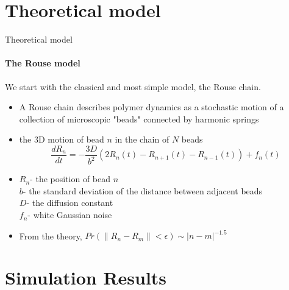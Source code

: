 \documentclass[8pt]{beamer}
\begin{document}
\section{Theoretical model}\label{section_theoreticalModel}
\begin{frame}{Theoretical model}
\framesubtitle{The Rouse model}
We start with the classical and most simple model, the Rouse chain.
\begin{itemize}
\item A Rouse chain describes polymer dynamics as a stochastic motion of a collection of microscopic "beads" connected by harmonic springs
\item the 3D  motion of bead $n$ in the chain of $N$ beads 
\begin{equation*}
\frac{dR_n}{dt} = -\frac{3D}{b^2}(2R_n(t)-R_{n+1}(t)-R_{n-1}(t))+f_n(t)
\end{equation*}
\item $R_n$- the position of bead $n$\\
$b$- the standard deviation of the distance between adjacent beads\\
$D$- the diffusion constant\\
$f_n$- white Gaussian noise
\item From the theory, $Pr(\|R_n-R_m\|<\epsilon)\sim  |n-m|^{-1.5}$
\end{itemize}
\end{frame}

\section{Simulation Results}\label{section_simulationResults}
\end{document}

